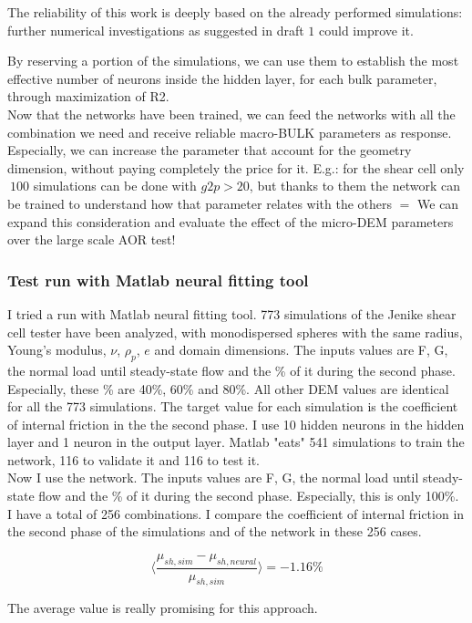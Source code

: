 The reliability of this work is deeply based on the already performed simulations: further numerical investigations as suggested in draft $1$ could improve it.

By reserving a portion of the simulations, we can use them to establish the most effective number of neurons inside the hidden layer, for each bulk parameter, through maximization of R2.\\

Now that the networks have been trained, we can feed the networks with all the combination we need and receive reliable macro-BULK parameters as response.
Especially, we can increase the parameter that account for the geometry dimension, without paying completely the price for it.
E.g.: for the shear cell only $~100$ simulations can be done with $g2p >20$, but thanks to them the network can be trained to understand how that parameter relates with the others $=$ We can expand this consideration and evaluate the effect of the micro-DEM parameters over the large scale AOR test!


\subsubsection{Test run with Matlab neural fitting tool}
\label{subsubsection:testrunmatlab}

I tried a run with Matlab neural fitting tool.
773 simulations of the Jenike shear cell tester have been analyzed, with monodispersed spheres with the same radius, Young's modulus, $\nu$, $\rho_p$, $e$ and domain dimensions.
The inputs values are F, G, the normal load until steady-state flow and the \% of it during the second phase.
Especially, these \% are 40\%, 60\% and 80\%.
All other DEM values are identical for all the 773 simulations.
The target value for each simulation is the coefficient of internal friction in the the second phase.
I use 10 hidden neurons in the hidden layer and 1 neuron in the output layer.
Matlab "eats" 541 simulations to train the network, 116 to validate it and 116 to test it.\\
Now I use the network. 
The inputs values are F, G, the normal load until steady-state flow and the \% of it during the second phase.
Especially, this is only 100\%.
I have a total of 256 combinations.
I compare the coefficient of internal friction in the second phase of the simulations and of the network in these 256 cases.

 \begin{equation}
\langle{ \frac{\mu_{sh,sim}-\mu_{sh,neural}}{\mu_{sh,sim}}}\rangle = -1.16 \%
\end{equation}

The average value is really promising for this approach.

